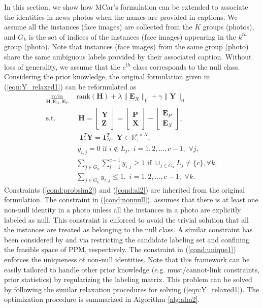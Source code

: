 \documentclass[10pt,journal,compsoc]{IEEEtran}
\begin{document}
In this section, we show how MCar's formulation can be extended to associate the identities in news photos when the names are provided in captions. We assume all the instances (face images) are collected from the $K$ groups (photos), and $G_k$ is the set of indices of the instances (face images) appearing in the $k^{th}$ group (photo). Note that instances (face images) from the same group (photo) share the same ambiguous labels provided by their associated caption. Without loss of generality, we assume that the $c^{th}$ class corresponds to the null class. Considering the prior knowledge, the original formulation given in (\ref{eqn:Y_relaxed1}) can be reformulated as
\begin{align}
 \min_{\mathbf{H}, \mathbf{E}_X, \mathbf{E}_P} \,\, & \mathrm{rank} (\mathbf{H}) + \lambda \|\mathbf{E}_X\|_0  +  \gamma \|\mathbf{Y}\|_0  \label{eqn:HardExt} \\
 \text{s.t.} & \;
{\mathbf{H}}= \begin{bmatrix}
\mathbf{Y} \\
\mathbf{Z}
\end{bmatrix}= \begin{bmatrix}
\mathbf{P} \\
\mathbf{X}
\end{bmatrix} - \begin{bmatrix}
\mathbf{E}_P \\
\mathbf{E}_X
\end{bmatrix}, \nonumber\\
&\,\; \mathbf{1}^T_c \mathbf{Y} = \mathbf{1}^T_N, \,\, \mathbf{Y} \in \mathbb{R}_+^{c \times N}, \label{cond:probsim2}\\
&\, y_{i,j} = 0 \,\, \mathrm{if}  \,\, i \notin L_j, \,\, i = 1, 2,  \dots, c-1, \,\, \forall j, \label{cond:al2}\\
&\sum_{j \in G_k}  \sum_{i=1}^{c-1} y_{i,j}  \geq 1 \,\, \mathrm{if} \,\,  \mathop{\cup}_{j \in G_k} L_j \neq \{c\}, \forall k, \label{cond:nonnull} \\
& \sum_{j \in G_k} y_{i,j}  \leq 1, \,\, i = 1, 2, \dots, c-1, \,\,  \forall k. \label{cond:unique1}
\end{align}
Constraints (\ref{cond:probsim2}) and (\ref{cond:al2}) are inherited from the original formulation. The constraint in (\ref{cond:nonnull}), assumes that there is at least one non-null identity in a photo unless all the instances in a photo are explicitly labeled as null. This constraint is enforced to avoid the trivial solution that all the instances are treated as belonging to the null class.
 A similar constraint has been considered by \cite{Luo2010} and \cite{Zeng2013} via restricting the candidate labeling set and confining the feasible space of PPM, respectively. The constraint in (\ref{cond:unique1}) enforces the uniqueness of non-null identities. Note that this framework can be easily tailored to handle other prior knowledge (e.g. must/cannot-link constraints, prior statistics) by regularizing the labeling matrix. This problem can be solved by following the similar relaxation procedures for solving (\ref{eqn:Y_relaxed1}). The optimization procedure is summarized in Algorithm \ref{alg:alm2}.
\end{document}
